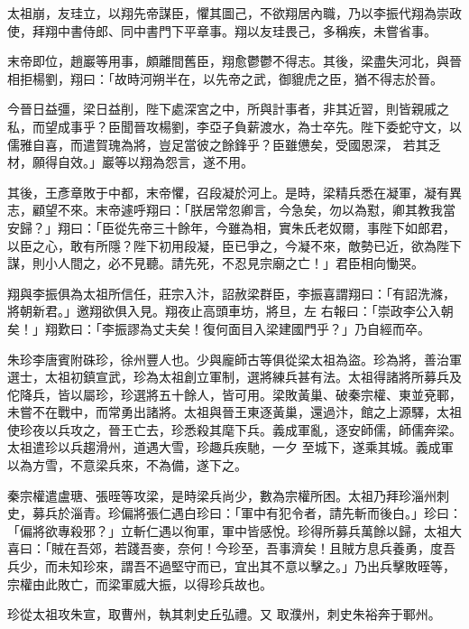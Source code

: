 \begin{pinyinscope}
 太祖崩，友珪立，以翔先帝謀臣，懼其圖己，不欲翔居內職，乃以李振代翔為崇政使，拜翔中書侍郎、同中書門下平章事。翔以友珪畏己，多稱疾，未嘗省事。



 末帝即位，趙巖等用事，頗離間舊臣，翔愈鬱鬱不得志。其後，梁盡失河北，與晉相拒楊劉，翔曰：「故時河朔半在，以先帝之武，御貔虎之臣，猶不得志於晉。



 今晉日益彊，梁日益削，陛下處深宮之中，所與計事者，非其近習，則皆親戚之私，而望成事乎？臣聞晉攻楊劉，李亞子負薪渡水，為士卒先。陛下委蛇守文，以儒雅自喜，而遣賀瑰為將，豈足當彼之餘鋒乎？臣雖憊矣，受國恩深，
 若其乏材，願得自效。」巖等以翔為怨言，遂不用。



 其後，王彥章敗于中都，末帝懼，召段凝於河上。是時，梁精兵悉在凝軍，凝有異志，顧望不來。末帝遽呼翔曰：「朕居常忽卿言，今急矣，勿以為懟，卿其教我當安歸？」翔曰：「臣從先帝三十餘年，今雖為相，實朱氏老奴爾，事陛下如郎君，以臣之心，敢有所隱？陛下初用段凝，臣已爭之，今凝不來，敵勢已近，欲為陛下謀，則小人間之，必不見聽。請先死，不忍見宗廟之亡！」君臣相向慟哭。



 翔與李振俱為太祖所信任，莊宗入汴，詔赦梁群臣，李振喜謂翔曰：「有詔洗滌，將朝新君。」邀翔欲俱入見。翔夜止高頭車坊，將旦，左
 右報曰：「崇政李公入朝矣！」翔歎曰：「李振謬為丈夫矣！復何面目入梁建國門乎？」乃自經而卒。



 朱珍李唐賓附硃珍，徐州豐人也。少與龐師古等俱從梁太祖為盜。珍為將，善治軍選士，太祖初鎮宣武，珍為太祖創立軍制，選將練兵甚有法。太祖得諸將所募兵及佗降兵，皆以屬珍，珍選將五十餘人，皆可用。梁敗黃巢、破秦宗權、東並兗鄆，未嘗不在戰中，而常勇出諸將。太祖與晉王東逐黃巢，還過汴，館之上源驛，太祖使珍夜以兵攻之，晉王亡去，珍悉殺其麾下兵。義成軍亂，逐安師儒，師儒奔梁。太祖遣珍以兵趨滑州，道遇大雪，珍趣兵疾馳，一夕
 至城下，遂乘其城。義成軍以為方雪，不意梁兵來，不為備，遂下之。



 秦宗權遣盧瑭、張晊等攻梁，是時梁兵尚少，數為宗權所困。太祖乃拜珍淄州刺史，募兵於淄青。珍偏將張仁遇白珍曰：「軍中有犯令者，請先斬而後白。」珍曰：「偏將欲專殺邪？」立斬仁遇以徇軍，軍中皆感悅。珍得所募兵萬餘以歸，太祖大喜曰：「賊在吾郊，若踐吾麥，奈何！今珍至，吾事濟矣！且賊方息兵養勇，度吾兵少，而未知珍來，謂吾不過堅守而已，宜出其不意以擊之。」乃出兵擊敗晊等，宗權由此敗亡，而梁軍威大振，以得珍兵故也。



 珍從太祖攻朱宣，取曹州，執其刺史丘弘禮。又
 取濮州，刺史朱裕奔于鄆州。




\end{pinyinscope}
